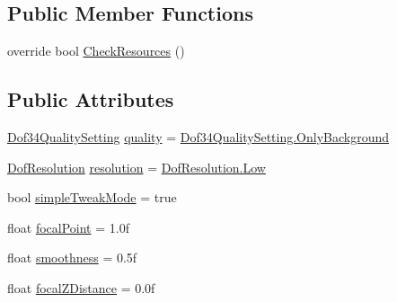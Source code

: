 \subsection*{Public Member Functions}
\begin{DoxyCompactItemize}
\item 
override bool \mbox{\hyperlink{class_unity_standard_assets_1_1_image_effects_1_1_depth_of_field_deprecated_a58771c7e642e157ab5967aed241c9c3d}{Check\+Resources}} ()
\end{DoxyCompactItemize}
\subsection*{Public Attributes}
\begin{DoxyCompactItemize}
\item 
\mbox{\hyperlink{class_unity_standard_assets_1_1_image_effects_1_1_depth_of_field_deprecated_a49aeac3eaa0d36567973103fb895b1d9}{Dof34\+Quality\+Setting}} \mbox{\hyperlink{class_unity_standard_assets_1_1_image_effects_1_1_depth_of_field_deprecated_aaf4842adbf0fdf668b60af2de6f5c795}{quality}} = \mbox{\hyperlink{class_unity_standard_assets_1_1_image_effects_1_1_depth_of_field_deprecated_a49aeac3eaa0d36567973103fb895b1d9aa3c2f94bc3e93295c2d2eae9587089a3}{Dof34\+Quality\+Setting.\+Only\+Background}}
\item 
\mbox{\hyperlink{class_unity_standard_assets_1_1_image_effects_1_1_depth_of_field_deprecated_afba0d38461312bf69068aee575fed15d}{Dof\+Resolution}} \mbox{\hyperlink{class_unity_standard_assets_1_1_image_effects_1_1_depth_of_field_deprecated_a9651a60202f4d3c34ee840334293c923}{resolution}} = \mbox{\hyperlink{class_unity_standard_assets_1_1_image_effects_1_1_depth_of_field_deprecated_afba0d38461312bf69068aee575fed15da28d0edd045e05cf5af64e35ae0c4c6ef}{Dof\+Resolution.\+Low}}
\item 
bool \mbox{\hyperlink{class_unity_standard_assets_1_1_image_effects_1_1_depth_of_field_deprecated_a2949e8a9c6b625685ce6794378c420c2}{simple\+Tweak\+Mode}} = true
\item 
float \mbox{\hyperlink{class_unity_standard_assets_1_1_image_effects_1_1_depth_of_field_deprecated_a84e2df980b6aa674c26f98491cc99517}{focal\+Point}} = 1.\+0f
\item 
float \mbox{\hyperlink{class_unity_standard_assets_1_1_image_effects_1_1_depth_of_field_deprecated_a9fdc06de652648e0ccfba3b74eb24e33}{smoothness}} = 0.\+5f
\item 
float \mbox{\hyperlink{class_unity_standard_assets_1_1_image_effects_1_1_depth_of_field_deprecated_ad80b6eda7b9940f54416509b8a566e74}{focal\+Z\+Distance}} = 0.\+0f

\end{DoxyCompactItemize}
